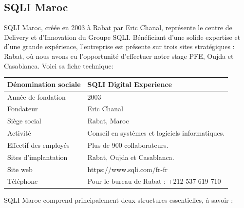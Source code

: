 \subsection{SQLI Maroc}

SQLI Maroc, créée en 2003 à Rabat par Eric Chanal, représente le centre de Delivery et d'Innovation du Groupe SQLI. Bénéficiant d'une solide expertise et d'une grande expérience, l'entreprise est présente sur trois sites stratégiques : Rabat, où nous avons eu l'opportunité d'effectuer notre stage PFE, Oujda et Casablanca.   Voici sa fiche technique:




\begin{center}
    \captionsetup{type=table}
    \vspace{0.3cm}
    \begin{tabularx}{17cm}{|X|X|}
      \hline
     \textbf{Dénomination sociale}  & \textbf{SQLI Digital Experience} \\
      \hline
     {Année de fondation} & 2003  \\
      \hline
      {Fondateur} & Eric Chanal  \\
      \hline
     {Siège social} & Rabat, Maroc\\
     \hline  
     {Activité} & Conseil en systèmes et logiciels informatiques.\\
      \hline  
     {Effectif des employés} & Plus de 900 collaborateurs.\\
      \hline
     {Sites d'implantation} & Rabat, Oujda et Casablanca.\\
      \hline
     {Site web} & https://www.sqli.com/fr-fr\\
      \hline
     {Téléphone} & Pour le bureau de Rabat : +212 537 619 710 \\
      \hline
    \end{tabularx}
    \end{center}
    

  SQLI Maroc comprend principalement deux structures essentielles, à savoir :

